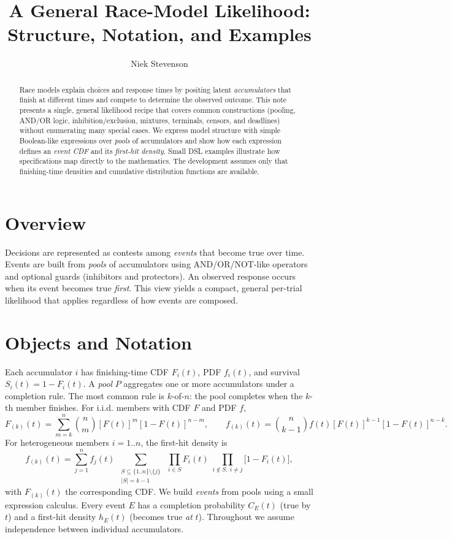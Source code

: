 \documentclass[11pt]{article}
\title{A General Race-Model Likelihood: Structure, Notation, and Examples}
\author{Niek Stevenson}
\date{}
\begin{document}
\maketitle
\begin{abstract}
Race models explain choices and response times by positing latent \emph{accumulators} that finish at different times and compete to determine the observed outcome. This note presents a single, general likelihood recipe that covers common constructions (pooling, AND/OR logic, inhibition/exclusion, mixtures, terminals, censors, and deadlines) without enumerating many special cases. We express model structure with simple Boolean-like expressions over \emph{pools} of accumulators and show how each expression defines an \emph{event CDF} and its \emph{first-hit density}. Small DSL examples illustrate how specifications map directly to the mathematics. The development assumes only that finishing-time densities and cumulative distribution functions are available.
\end{abstract}
\section{Overview}
Decisions are represented as contests among \emph{events} that become true over time. Events are built from \emph{pools} of accumulators using AND/OR/NOT-like operators and optional guards (inhibitors and protectors). An observed response occurs when its event becomes true \emph{first}. This view yields a compact, general per-trial likelihood that applies regardless of how events are composed.
\section{Objects and Notation}
Each accumulator $i$ has finishing-time CDF $F_i(t)$, PDF $f_i(t)$, and survival $S_i(t)=1-F_i(t)$. A \emph{pool} $P$ aggregates one or more accumulators under a completion rule. The most common rule is $k$-of-$n$: the pool completes when the $k$-th member finishes. For i.i.d. members with CDF $F$ and PDF $f$,
\begin{equation}
  F_{(k)}(t) = \sum_{m=k}^{n} {n\choose m} [F(t)]^{m} [1-F(t)]^{n-m},\qquad
  f_{(k)}(t) = {n\choose k-1} f(t) [F(t)]^{k-1} [1-F(t)]^{n-k}.\label{eq:pool-kofn}
\end{equation}
For heterogeneous members $i=1..n$, the first-hit density is
\begin{equation}
  f_{(k)}(t) = \sum_{j=1}^{n} f_j(t)\; \sum_{\substack{S\subseteq \{1..n\}\setminus\{j\}\\ |S|=k-1}}\; \prod_{i\in S} F_i(t)\; \prod_{i\notin S,\ i\ne j} \bigl[1-F_i(t)\bigr],\label{eq:pool-kofn-hetero}
\end{equation}
with $F_{(k)}(t)$ the corresponding CDF.
We build \emph{events} from pools using a small expression calculus. Every event $E$ has a completion probability $C_E(t)$ (true by $t$) and a first-hit density $h_E(t)$ (becomes true \emph{at} $t$). Throughout we assume independence between individual accumulators. 
\end{document}
